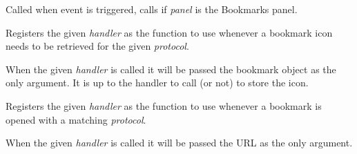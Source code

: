 \documentclass[letterpaper,10pt,openany]{sphinxmanual}
\begin{document}

\begin{fulllineitems}
\label{Applications/terminal/plugin_bookmarks:GateOne.Bookmarks.panelToggleIn}
Called when  event is triggered, calls {\hyperref[Applications/terminal/plugin_bookmarks:GateOne.Bookmarks.createPanel]{}} if \emph{panel} is the Bookmarks panel.

\end{fulllineitems}


\begin{fulllineitems}
\label{Applications/terminal/plugin_bookmarks:GateOne.Bookmarks.registerIconHandler}
Registers the given \emph{handler} as the function to use whenever a bookmark icon needs to be retrieved for the given \emph{protocol}.

When the given \emph{handler} is called it will be passed the bookmark object as the only argument.  It is up to the handler to call (or not)  to store the icon.

\end{fulllineitems}


\begin{fulllineitems}
\label{Applications/terminal/plugin_bookmarks:GateOne.Bookmarks.registerURLHandler}
Registers the given \emph{handler} as the function to use whenever a bookmark is opened with a matching \emph{protocol}.

When the given \emph{handler} is called it will be passed the URL as the only argument.

\end{fulllineitems}

\end{document}
